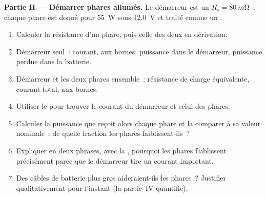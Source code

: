 \begin{problem}
\medskip
\noindent\textbf{Partie II --- Démarrer phares allumés.}
Le démarreur est un  $R_s = \qty{80}{m\ohm}$~; chaque
phare est donné pour \qty{55}{W} sous \qty{12.0}{V} et traité comme un
.
\begin{enumerate}[resume]
  \item Calculer la résistance d'un phare, puis celle des deux en
        dérivation.
  \item Démarreur seul~: courant,  aux bornes, puissance dans le
        démarreur, puissance perdue dans la batterie.
  \item Démarreur et les deux phares ensemble~: résistance de charge
        équivalente, courant total,  aux bornes.
  \item Utiliser le  pour trouver le courant du
        démarreur et celui des phares.
  \item Calculer la puissance que reçoit alors chaque phare et la
        comparer à sa valeur nominale~: de quelle fraction les phares
        faiblissent-ils~?
  \item Expliquer en deux phrases, avec la , pourquoi les
        phares faiblissent précisément parce que le démarreur tire un
        courant important.
  \item Des câbles de batterie plus gros aideraient-ils les phares~?
        Justifier qualitativement pour l'instant (la partie~IV
        quantifie).
\end{enumerate}


\end{problem}
